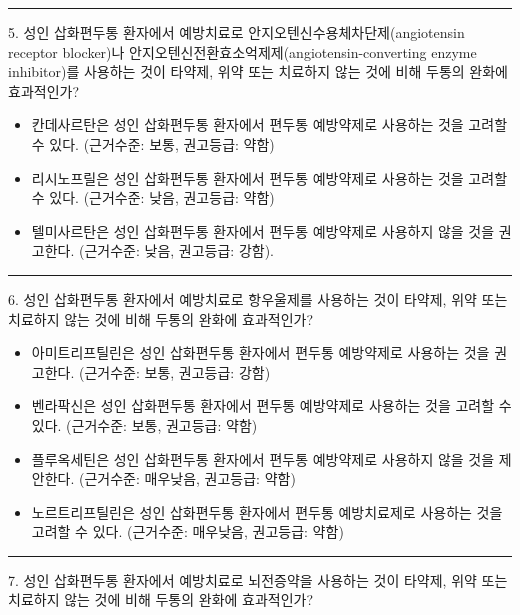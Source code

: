 \documentclass[]{book}
\begin{document}
\begin{center}\rule{0.5\linewidth}{\linethickness}\end{center}

5. 성인 삽화편두통 환자에서 예방치료로 안지오텐신수용체차단제(angiotensin receptor blocker)나 안지오텐신전환효소억제제(angiotensin-converting enzyme inhibitor)를 사용하는 것이 타약제, 위약 또는 치료하지 않는 것에 비해 두통의 완화에 효과적인가?

\begin{itemize}
\item
  칸데사르탄은 성인 삽화편두통 환자에서 편두통 예방약제로 사용하는 것을 고려할 수 있다. (근거수준: 보통, 권고등급: 약함)
\item
  리시노프릴은 성인 삽화편두통 환자에서 편두통 예방약제로 사용하는 것을 고려할 수 있다. (근거수준: 낮음, 권고등급: 약함)
\item
  텔미사르탄은 성인 삽화편두통 환자에서 편두통 예방약제로 사용하지 않을 것을 권고한다. (근거수준: 낮음, 권고등급: 강함).
\end{itemize}

\begin{center}\rule{0.5\linewidth}{\linethickness}\end{center}

6. 성인 삽화편두통 환자에서 예방치료로 항우울제를 사용하는 것이 타약제, 위약 또는 치료하지 않는 것에 비해 두통의 완화에 효과적인가?

\begin{itemize}
\item
  아미트리프틸린은 성인 삽화편두통 환자에서 편두통 예방약제로 사용하는 것을 권고한다. (근거수준: 보통, 권고등급: 강함)
\item
  벤라팍신은 성인 삽화편두통 환자에서 편두통 예방약제로 사용하는 것을 고려할 수 있다. (근거수준: 보통, 권고등급: 약함)
\item
  플루옥세틴은 성인 삽화편두통 환자에서 편두통 예방약제로 사용하지 않을 것을 제안한다. (근거수준: 매우낮음, 권고등급: 약함)
\item
  노르트리프틸린은 성인 삽화편두통 환자에서 편두통 예방치료제로 사용하는 것을 고려할 수 있다. (근거수준: 매우낮음, 권고등급: 약함)
\end{itemize}

\begin{center}\rule{0.5\linewidth}{\linethickness}\end{center}

7. 성인 삽화편두통 환자에서 예방치료로 뇌전증약을 사용하는 것이 타약제, 위약 또는 치료하지 않는 것에 비해 두통의 완화에 효과적인가?
\end{document}
